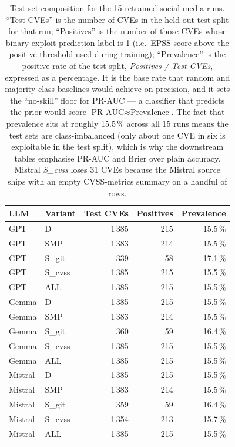 \documentclass[11pt,a4paper]{article}
\begin{document}
\begin{table}[!htbp]
\centering\small
\setlength{\tabcolsep}{6pt}
\begin{tabular}{l l r r r}
\toprule
LLM     & Variant   & Test CVEs & Positives & Prevalence \\
\midrule
GPT     & D         & 1\,385 & 215 & 15.5\,\% \\
GPT     & SMP       & 1\,383 & 214 & 15.5\,\% \\
GPT     & S\_git    &   339 &  58 & 17.1\,\% \\
GPT     & S\_cvss   & 1\,385 & 215 & 15.5\,\% \\
GPT     & ALL       & 1\,385 & 215 & 15.5\,\% \\
\midrule
Gemma   & D         & 1\,385 & 215 & 15.5\,\% \\
Gemma   & SMP       & 1\,383 & 214 & 15.5\,\% \\
Gemma   & S\_git    &   360 &  59 & 16.4\,\% \\
Gemma   & S\_cvss   & 1\,385 & 215 & 15.5\,\% \\
Gemma   & ALL       & 1\,385 & 215 & 15.5\,\% \\
\midrule
Mistral & D         & 1\,385 & 215 & 15.5\,\% \\
Mistral & SMP       & 1\,383 & 214 & 15.5\,\% \\
Mistral & S\_git    &   359 &  59 & 16.4\,\% \\
Mistral & S\_cvss   & 1\,354 & 213 & 15.7\,\% \\
Mistral & ALL       & 1\,385 & 215 & 15.5\,\% \\
\bottomrule
\end{tabular}
\caption{Test-set composition for the 15 retrained
social-media runs. ``Test CVEs'' is the number of CVEs
in the held-out test split for that run; ``Positives''
is the number of those CVEs whose binary
exploit-prediction label is 1 (i.e.\ EPSS score above
the positive threshold used during training);
``Prevalence'' is the positive rate of the test split,
\emph{Positives / Test CVEs}, expressed as a percentage.
It is the base rate that random and majority-class
baselines would achieve on precision, and it sets the
``no-skill'' floor for PR-AUC --- a classifier that
predicts the prior would score $\text{PR-AUC} \approx
\text{Prevalence}$. The fact that prevalence sits at
roughly 15.5\,\% across all 15 runs means the test sets
are class-imbalanced (only about one CVE in six is
exploitable in the test split), which is why the
downstream tables emphasise PR-AUC and Brier over plain
accuracy. Mistral \emph{S\_cvss} loses 31 CVEs because
the Mistral source ships with an empty CVSS-metrics
summary on a handful of rows.}
\label{tab:smp-sizes}
\end{table}
\end{document}
